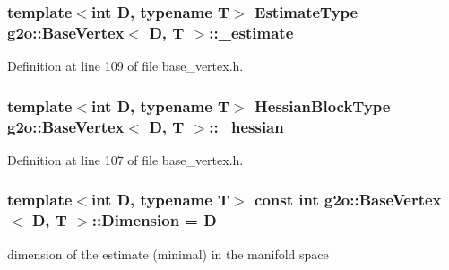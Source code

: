 \subsubsection[{\texorpdfstring{\+\_\+estimate}{_estimate}}]{\setlength{\rightskip}{0pt plus 5cm}template$<$int D, typename T$>$ {\bf Estimate\+Type} {\bf g2o\+::\+Base\+Vertex}$<$ D, T $>$\+::\+\_\+estimate\hspace{0.3cm}{\ttfamily [protected]}}\hypertarget{classg2o_1_1BaseVertex_ab188c92c3e906c6e06507ae624c0e7ac}{}\label{classg2o_1_1BaseVertex_ab188c92c3e906c6e06507ae624c0e7ac}


Definition at line 109 of file base\+\_\+vertex.\+h.

\subsubsection[{\texorpdfstring{\+\_\+hessian}{_hessian}}]{\setlength{\rightskip}{0pt plus 5cm}template$<$int D, typename T$>$ {\bf Hessian\+Block\+Type} {\bf g2o\+::\+Base\+Vertex}$<$ D, T $>$\+::\+\_\+hessian\hspace{0.3cm}{\ttfamily [protected]}}\hypertarget{classg2o_1_1BaseVertex_afaf73b0e874db76655d90bdb2f156c00}{}\label{classg2o_1_1BaseVertex_afaf73b0e874db76655d90bdb2f156c00}


Definition at line 107 of file base\+\_\+vertex.\+h.

\subsubsection[{\texorpdfstring{Dimension}{Dimension}}]{\setlength{\rightskip}{0pt plus 5cm}template$<$int D, typename T$>$ const int {\bf g2o\+::\+Base\+Vertex}$<$ D, T $>$\+::Dimension = D\hspace{0.3cm}{\ttfamily [static]}}\hypertarget{classg2o_1_1BaseVertex_a9a831bfdf84cfe625d8f942bc4f1c2d1}{}\label{classg2o_1_1BaseVertex_a9a831bfdf84cfe625d8f942bc4f1c2d1}


dimension of the estimate (minimal) in the manifold space 



